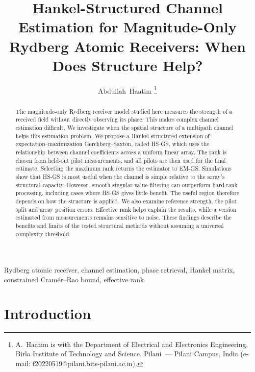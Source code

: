 \documentclass[journal]{IEEEtran}
\begin{document}
\title{Hankel-Structured Channel Estimation for Magnitude-Only Rydberg Atomic Receivers: When Does Structure Help?}

\author{Abdullah~Haatim%
\thanks{A.~Haatim is with the Department of Electrical and Electronics
Engineering, Birla Institute of Technology and Science, Pilani~--- Pilani
Campus, India (e-mail: f20220519@pilani.bits-pilani.ac.in).}}

\maketitle

\begin{abstract}
The magnitude-only Rydberg receiver model studied here measures the
strength of a received field without directly observing its phase. This
makes complex channel estimation difficult. We investigate when the
spatial structure of a multipath channel helps this estimation problem.
We propose a Hankel-structured extension of expectation--maximization
Gerchberg--Saxton, called HS-GS, which uses the relationship between channel
coefficients across a uniform linear array. The rank is chosen from
held-out pilot measurements, and all pilots are then used for the final
estimate. Selecting the maximum rank returns the estimator to EM-GS.
Simulations show that HS-GS is most useful when the channel is simple
relative to the array's structural capacity. However, smooth
singular-value filtering can outperform hard-rank processing, including
cases where HS-GS gives little benefit. The useful region therefore
depends on how the structure is applied. We also examine reference
strength, the pilot split and array position errors. Effective rank helps
explain the results, while a version estimated from measurements remains
sensitive to noise. These findings describe the benefits and limits of
the tested structural methods without assuming a universal complexity
threshold.

\end{abstract}

\begin{IEEEkeywords}
Rydberg atomic receiver, channel estimation, phase retrieval, Hankel matrix,
constrained Cram\'er--Rao bound, effective rank.
\end{IEEEkeywords}


\section{Introduction}
\end{document}
